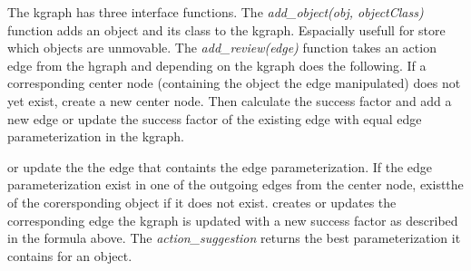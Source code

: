 The \ac{kgraph} has three interface functions. The \textit{add\_object(\gls{obj}, \gls{objectClass})} function adds an object and its class to the \ac{kgraph}. Espacially usefull for store which objects are unmovable. The \textit{add\_review(\gls{edge})} function takes an action edge from the \ac{hgraph} and depending on the \ac{kgraph} does the following. If a corresponding center node (containing the object the edge manipulated) does not yet exist, create a new center node. Then calculate the success factor and add a new edge or update the success factor of the existing edge with equal edge parameterization in the \ac{kgraph}.  


or update the the edge that containts the edge parameterization. If the edge parameterization exist in one of the outgoing edges from the center node, existthe of the corersponding object if it does not exist. 
creates or updates the corresponding edge  the \ac{kgraph} is updated with a new success factor as described in the formula above. The \textit{action\_suggestion} returns the best parameterization it contains for an object.\bs

